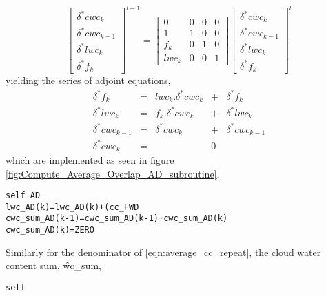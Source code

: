 \begin{equation}
  \left[ 
    \begin{array}{c}
      \delta^* cwc_k \\
      \delta^* cwc_{k-1} \\
      \delta^* lwc_k \\
      \delta^* f_k
    \end{array}
  \right]^{l-1} =
  \left[ 
    \begin{array}{cccc}
      0     & 0 & 0 & 0 \\
      1     & 1 & 0 & 0 \\
      f_k   & 0 & 1 & 0 \\
      lwc_k & 0 & 0 & 1
    \end{array}
  \right]
  \left[ 
    \begin{array}{c}
      \delta^* cwc_k \\
      \delta^* cwc_{k-1} \\
      \delta^* lwc_k \\
      \delta^* f_k
    \end{array}
  \right]^{l}
  \label{eqn:cwc_sum_ad_matrix}
\end{equation}
yielding the series of adjoint equations,
\begin{equation}
  \begin{array}{rcrcl}
    \delta^* f_k       & = & lwc_k.\delta^* cwc_k & + & \delta^* f_k       \\
    \delta^* lwc_k     & = &   f_k.\delta^* cwc_k & + & \delta^* lwc_k     \\
    \delta^* cwc_{k-1} & = &       \delta^* cwc_k & + & \delta^* cwc_{k-1} \\
    \delta^* cwc_k     & = &                      & 0 &
  \end{array}
  \label{eqn:cwc_sum_ad}
\end{equation}
which are implemented as seen in figure \ref{fig:Compute_Average_Overlap_AD_subroutine},
\begin{alltt}
self_AD%Cloud_Fraction(k) = self_AD%Cloud_Fraction(k) + (cc_FWD%iVar%lwc(k)       * cwc_sum_AD(k))
lwc_AD(k)                 = lwc_AD(k)                 + (cc_FWD%Cloud_Fraction(k) * cwc_sum_AD(k))
cwc_sum_AD(k-1)           = cwc_sum_AD(k-1)           + cwc_sum_AD(k)
cwc_sum_AD(k)             = ZERO
\end{alltt}
Similarly for the denominator of \ref{eqn:average_cc_repeat}, the cloud water content sum, \f{wc\_sum},
\begin{alltt}
  self%iVar%wc_sum(k) = self%iVar%wc_sum(k-1) + self%iVar%lwc(k)
\end{alltt}
